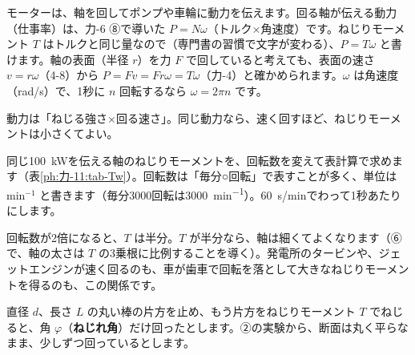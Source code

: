 \label{ph:力-11:sec5}モーターは、軸を回してポンプや車輪に動力を伝えます。回る軸が伝える動力（仕事率）は、力-6 ⑧で導いた $P=N\omega$（トルク×角速度）です。ねじりモーメント $T$ はトルクと同じ量なので（専門書の習慣で文字が変わる）、$P=T\omega$ と書けます。軸の表面（半径 $r$）を力 $F$ で回していると考えても、表面の速さ $v=r\omega$（4-8）から $P=Fv=Fr\omega=T\omega$（力-4）と確かめられます。$\omega$ は角速度（rad/s）で、1秒に $n$ 回転するなら $\omega=2\pi n$ です。\label{ph:力-11:Tw}
\begin{phyomi}[$P=T\omega$]
動力は「ねじる強さ×回る速さ」。同じ動力なら、速く回すほど、ねじりモーメントは小さくてよい。
\end{phyomi}
同じ\qty{100}{kW}を伝える軸のねじりモーメントを、回転数を変えて表計算で求めます（表\ref{ph:力-11:tab-Tw}）。回転数は「毎分○回転」で表すことが多く、単位は min$^{-1}$ と書きます（毎分3000回転は\qty{3000}{min^{-1}}）。\qty{60}{s/min}でわって1秒あたりにします。

\noindent\begin{minipage}[c]{0.58\linewidth}
\centering
{}
\label{ph:力-11:tab-Tw}
\end{minipage}\hfill
\begin{minipage}[c]{0.38\linewidth}
回転数が2倍になると、$T$ は半分。$T$ が半分なら、軸は細くてよくなります（⑥で、軸の太さは $T$ の3乗根に比例することを導く）。発電所のタービンや、ジェットエンジンが速く回るのも、車が歯車で回転を落として大きなねじりモーメントを得るのも、この関係です。
\end{minipage}

\phkokomade


\label{ph:力-11:sec6}直径 $d$、長さ $L$ の丸い棒の片方を止め、もう片方をねじりモーメント $T$ でねじると、角 $\varphi$（\textbf{ねじれ角}）だけ回ったとします。②の実験から、断面は丸く平らなまま、少しずつ回っているとします。

